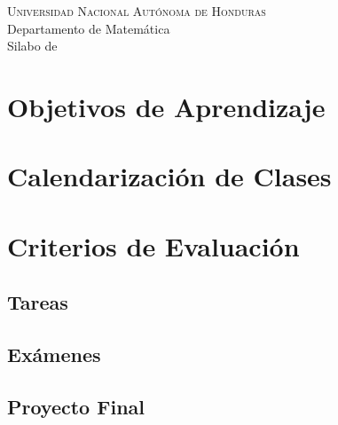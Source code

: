 \documentclass[letterpaper]{article}
\begin{document}
\begin{center}
  \Large \textsc{Universidad Nacional Autónoma de Honduras}\\
  \large Departamento de Matemática\\
  Silabo de %
\end{center}

\section{Objetivos de Aprendizaje}
\section{Calendarización de Clases}
\section{Criterios de Evaluación}
\subsection{Tareas}
\subsection{Exámenes}
\subsection{Proyecto Final}
\end{document}
